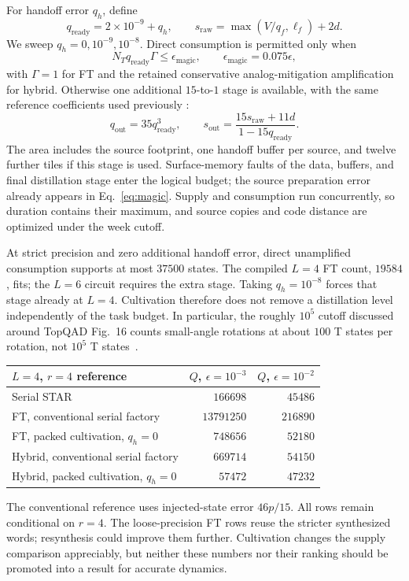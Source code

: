 \documentclass[11pt]{article}
\newcommand{\eps}{\epsilon}
\begin{document}
For handoff error $q_h$, define
\begin{equation}
 q_{\mathrm{ready}}=2\times10^{-9}+q_h,\qquad
 s_{\mathrm{raw}}=\max(V/q_f,\ell_f)+2d.
\end{equation}
We sweep $q_h=0,10^{-9},10^{-8}$. Direct consumption is permitted only when
\begin{equation}\label{eq:magic}
 N_T q_{\mathrm{ready}}\Gamma\leq\eps_{\mathrm{magic}},
 \qquad \eps_{\mathrm{magic}}=0.075\eps,
\end{equation}
with $\Gamma=1$ for FT and the retained conservative analog-mitigation
amplification for hybrid. Otherwise one additional $15$-to-$1$ stage is
available, with the same reference coefficients used previously
\cite{litinski}:
\begin{equation}
 q_{\mathrm{out}}=35q_{\mathrm{ready}}^3,\qquad
 s_{\mathrm{out}}=\frac{15s_{\mathrm{raw}}+11d}{1-15q_{\mathrm{ready}}}.
\end{equation}
The area includes the source footprint, one handoff buffer per source,
and twelve further tiles if this stage is used. Surface-memory faults of
the data, buffers, and final distillation stage enter the logical budget;
the source preparation error already appears in Eq.~\eqref{eq:magic}.
Supply and consumption run concurrently, so duration contains their maximum,
and source copies and code distance are optimized under the week cutoff.

At strict precision and zero additional handoff error, direct unamplified
consumption supports at most $37500$ states. The compiled $L=4$ FT count,
$19584$, fits; the $L=6$ circuit requires the extra stage. Taking
$q_h=10^{-8}$ forces that stage already at $L=4$. Cultivation therefore does
not remove a distillation level independently of the task budget. In
particular, the roughly $10^5$ cutoff discussed around TopQAD Fig.~16
counts small-angle rotations at about $100$ T states per rotation, not
$10^5$ T states~\cite{chung}.

\begin{center}
\begin{tabular}{lrr}
\toprule
$L=4$, $r=4$ reference & $Q$, $\eps=10^{-3}$ & $Q$, $\eps=10^{-2}$\\
\midrule
Serial STAR & $166698$ & $45486$\\
FT, conventional serial factory & $13791250$ & $216890$\\
FT, packed cultivation, $q_h=0$ & $748656$ & $52180$\\
Hybrid, conventional serial factory & $669714$ & $54150$\\
Hybrid, packed cultivation, $q_h=0$ & $57472$ & $47232$\\
\bottomrule
\end{tabular}
\end{center}
The conventional reference uses injected-state error $46p/15$. All rows
remain conditional on $r=4$. The loose-precision FT rows reuse the stricter
synthesized words; resynthesis could improve them further. Cultivation
changes the supply comparison appreciably, but neither these numbers nor
their ranking should be promoted into a result for accurate dynamics.
\end{document}
